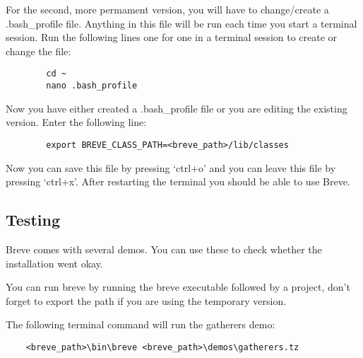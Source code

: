 	For the second, more permament version, you will have to change/create a .bash\_profile file. Anything in this file will be run each time you start a terminal session. Run the following lines one for one in a terminal session to create or change the file:
	\begin{lstlisting}
		cd ~
		nano .bash_profile
	\end{lstlisting}
	Now you have either created a .bash\_profile file or you are editing the existing version. Enter the following line:
	\begin{lstlisting}
		export BREVE_CLASS_PATH=<breve_path>/lib/classes
	\end{lstlisting}
	Now you can save this file by pressing `ctrl+o' and you can leave this file by pressing `ctrl+x'. After restarting the terminal you should be able to use Breve. 

\subsection{Testing}
	Breve comes with several demos. You can use these to check whether the installation went okay. 

	You can run breve by running the breve executable followed by a project, don't forget to export the path if you are using the temporary version.
	
	The following terminal command will run the gatherers demo:
	\begin{lstlisting}
	<breve_path>\bin\breve <breve_path>\demos\gatherers.tz
	\end{lstlisting}
